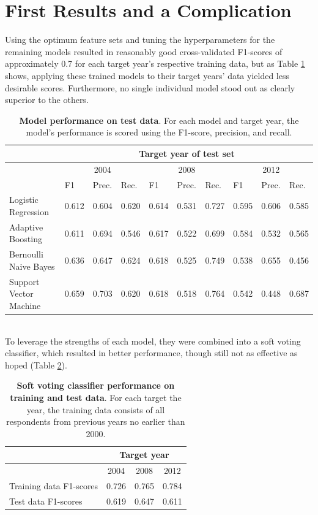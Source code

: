 \documentclass{article}
\begin{document}
	\section{First Results and a Complication}
	Using the optimum feature sets and tuning the hyperparameters for the remaining models resulted in reasonably good cross-validated F1-scores of approximately 0.7 for each target year's respective training data, but as Table \ref{table:tuning_testing_results} shows, applying these trained models to their target years' data yielded less desirable scores. Furthermore, no single individual model stood out as clearly superior to the others.
	\begin{table}[h]
		\begin{tabular}{|m{4cm}|m{0.9cm}|m{0.9cm}|m{0.9cm}|m{0.9cm}|m{0.9cm}|m{0.9cm}|m{0.9cm}|m{0.9cm}|m{0.9cm}|}
			\hline &
			\multicolumn{9}{|c|}{Target year of test set} \\
			\hline &
			\multicolumn{3}{|c|}{2004} &
			\multicolumn{3}{|c|}{2008} &
			\multicolumn{3}{|c|}{2012} \\
			\hline
			& F1 & Prec. & Rec. & F1 & Prec. & Rec. & F1 & Prec. & Rec. \\
			\hline
			Logistic Regression & 0.612 & 0.604 & 0.620 & 0.614 & 0.531 & 0.727 & 0.595 & 0.606 & 0.585
			\\ \hline
			Adaptive Boosting & 0.611 & 0.694 & 0.546 & 0.617 & 0.522 & 0.699 & 0.584 & 0.532 & 0.565
			\\ \hline
			Bernoulli Naive Bayes & 0.636 & 0.647 & 0.624 & 0.618 & 0.525 & 0.749 & 0.538 & 0.655 & 0.456
			\\ \hline
			Support Vector Machine & 0.659 & 0.703 & 0.620 & 0.618 & 0.518 & 0.764 & 0.542 & 0.448 & 0.687
			\\ \hline
		\end{tabular}
		\caption{\textbf{Model performance on test data}. For each model and target year, the model's performance is scored using the F1-score, precision, and recall.}
		\label{table:tuning_testing_results}
	\end{table}
	\hfill \\
	To leverage the strengths of each model, they were combined into a soft voting classifier, which resulted in better performance, though still not as effective as hoped (Table \ref{table:soft_voting_results}).
	\begin{table}[h]
		\begin{tabular}{|m{4cm}|m{1cm}|m{1cm}|m{1cm}|}
			\hline &
			\multicolumn{3}{|c|}{Target year} \\
			\hline &
			\multicolumn{1}{|c|}{2004} &
			\multicolumn{1}{|c|}{2008} &
			\multicolumn{1}{|c|}{2012} \\
			\hline
			Training data F1-scores & 0.726 & 0.765 & 0.784
			\\ \hline
			Test data F1-scores & 0.619 & 0.647 & 0.611
			\\ \hline
		\end{tabular}
		\caption{\textbf{Soft voting classifier performance on training and test data}. For each target the year, the training data consists of all respondents from previous years no earlier than 2000.}
		\label{table:soft_voting_results}
	\end{table}
\end{document}
